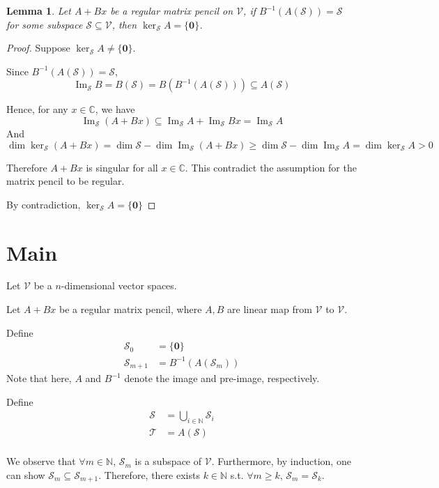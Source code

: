 \documentclass{article}
\newtheorem{lemma}[theorem]{Lemma}
\newcommand{\0}{\mathbf{0}}
\newcommand{\inv}{^{-1}}
\newcommand{\pen}[2]{#1+#2x}
\newcommand{\C}{\mathbb{C}}
\newcommand{\N}{\mathbb{N}}
\newcommand{\vecspace}[1]{\mathcal{#1}}
\newcommand{\vsV}{\vecspace{V}}
\newcommand{\vsS}{\vecspace{S}}
\newcommand{\vsT}{\vecspace{T}}
\DeclareMathOperator{\img}{Im}
\begin{document}
\begin{lemma}
    \label{lemma:regular_converge_inj}
    Let $A+Bx$ be a regular matrix pencil on $\vsV$, if $B\inv(A(\vsS))=\vsS$ for some subspace $\vsS\subseteq\vsV$, then $\ker_{\vsS}A=\{\0\}$.
\end{lemma}
\begin{proof}
    Suppose $\ker_{\vsS}A\neq\{\0\}$.

    Since $B\inv(A(\vsS))=\vsS$,
    \begin{equation*}
        \img_{\vsS}B = B(\vsS) = B(B\inv(A(\vsS))) \subseteq A(\vsS)
    \end{equation*}

    Hence, for any $x\in\C$, we have
    \begin{equation*}
        \img_{\vsS}(A+Bx)\subseteq\img_{\vsS}A+\img_{\vsS}Bx=\img_{\vsS}A
    \end{equation*}
    And
    \begin{equation*}
        \dim\ker_{\vsS}(A+Bx)=\dim\vsS-\dim\img_{\vsS}(A+Bx)\ge\dim\vsS-\dim\img_{\vsS}A=\dim\ker_{\vsS}A>0
    \end{equation*}

    Therefore $A+Bx$ is singular for all $x\in\C$.
    This contradict the assumption for the matrix pencil to be regular.

    By contradiction, $\ker_{\vsS}A=\{\0\}$
\end{proof}

\section{Main}

Let $\vsV$ be a $n$-dimensional vector spaces.

Let $\pen{A}{B}$ be a regular matrix pencil, where $A, B$ are linear map from $\vsV$ to $\vsV$.

Define
\begin{align*}
    \vsS_0 &= \{\0\}\\
    \vsS_{m+1} &= B\inv(A(\vsS_{m}))
\end{align*}
Note that here, $A$ and $B\inv$ denote the image and pre-image, respectively.

Define
\begin{align*}
    \vsS &= \bigcup_{i\in\N} \vsS_i\\
    \vsT &= A(\vsS)\\
\end{align*}

We observe that $\forall m\in\N$, $\vsS_m$ is a subspace of $\vsV$.
Furthermore, by induction, one can show $\vsS_m\subseteq\vsS_{m+1}$.
Therefore, there exists $k\in\N$ s.t. $\forall m\ge k$, $\vsS_m = \vsS_k$.
\end{document}

